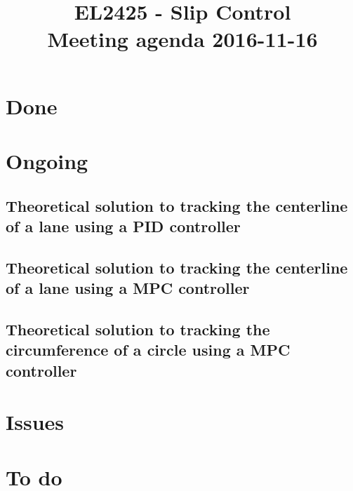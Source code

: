 \documentclass[oneside,12pt]{article}
\title{EL2425 - Slip Control \\ Meeting agenda 2016-11-16}
\begin{document}
\maketitle

\section{Done}




\section{Ongoing}

  \subsection{Theoretical solution to tracking the centerline of a lane using
    a PID controller}

    

  \subsection{Theoretical solution to tracking the centerline of a lane using
    a MPC controller}

    

  \subsection{Theoretical solution to tracking the circumference of a circle
    using a MPC controller}

    

\section{Issues}



\section{To do}

\end{document}

